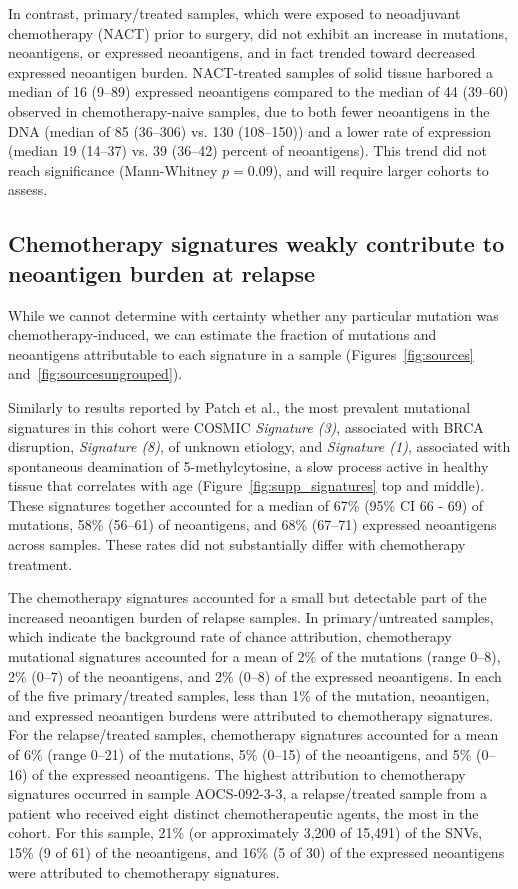In contrast, primary/treated samples, which were exposed to neoadjuvant chemotherapy (NACT) prior to surgery, did not exhibit an increase in mutations, neoantigens, or expressed neoantigens, and in fact trended toward decreased expressed neoantigen burden. NACT-treated samples of solid tissue harbored a median of 16 (9--89) expressed neoantigens compared to the median of 44 (39--60) observed in chemotherapy-naive samples, due to both fewer neoantigens in the DNA (median of 85 (36--306) vs. 130 (108--150)) and a lower rate of expression (median 19 (14--37) vs. 39 (36--42) percent of neoantigens). This trend did not reach significance (Mann-Whitney $p=0.09$), and will require larger cohorts to assess.

\subsection*{Chemotherapy signatures weakly contribute to neoantigen burden at relapse}

While we cannot determine with certainty whether any particular mutation was chemotherapy-induced, we can estimate the fraction of mutations and neoantigens attributable to each signature in a sample (Figures~\ref{fig:sources} and~\ref{fig:sourcesungrouped}).

Similarly to results reported by Patch et al., the most prevalent mutational signatures in this cohort were COSMIC \textit{Signature (3)}, associated with BRCA disruption, \textit{Signature (8)}, of unknown etiology, and \textit{Signature (1)}, associated with spontaneous deamination of 5-methylcytosine, a slow process active in healthy tissue that correlates with age (Figure~\ref{fig:supp_signatures} top and middle). These signatures together accounted for a median of 67\% (95\% CI 66 - 69) of mutations, 58\% (56--61) of neoantigens, and 68\% (67--71) expressed neoantigens across samples. These rates did not substantially differ with chemotherapy treatment.

The chemotherapy signatures accounted for a small but detectable part of the increased neoantigen burden of relapse samples. In primary/untreated samples, which indicate the background rate of chance attribution, chemotherapy mutational signatures accounted for a mean of 2\% of the mutations (range 0--8), 2\% (0--7) of the neoantigens, and 2\% (0--8) of the expressed neoantigens. In each of the five primary/treated samples, less than 1\% of the mutation, neoantigen, and expressed neoantigen burdens were attributed to chemotherapy signatures. For the relapse/treated samples, chemotherapy signatures accounted for a mean of 6\% (range 0--21) of the mutations, 5\% (0--15) of the neoantigens, and 5\% (0--16) of the expressed neoantigens. The highest attribution to chemotherapy signatures occurred in sample AOCS-092-3-3, a relapse/treated sample from a patient who received eight distinct chemotherapeutic agents, the most in the cohort. For this sample, 21\% (or approximately 3,200 of 15,491) of the SNVs, 15\% (9 of 61) of the neoantigens, and 16\% (5 of 30) of the expressed neoantigens were attributed to chemotherapy signatures.

